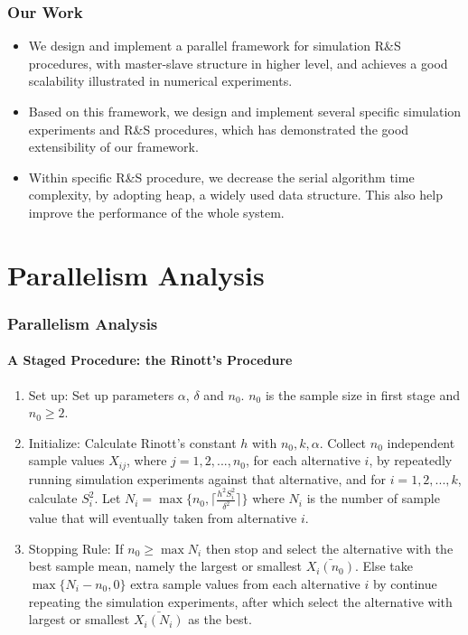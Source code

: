 \documentclass{beamer}
\begin{document}
\begin{frame}
\frametitle{Our Work}
\begin{itemize}
\item We design and implement a parallel framework for simulation R\&S procedures, with master-slave structure in higher level, and achieves a good scalability illustrated in numerical experiments.
\vspace{\baselineskip}
\item Based on this framework, we design and implement several specific simulation experiments and R\&S procedures, which has demonstrated the good extensibility of our framework.
\vspace{\baselineskip}
\item Within specific R\&S procedure, we decrease the serial algorithm time complexity, by adopting heap, a widely used data structure. This also help improve the performance of the whole system.
\end{itemize}
\end{frame}

\section{Parallelism Analysis}

\begin{frame}
\frametitle{Parallelism Analysis}
\framesubtitle{A Staged Procedure: the Rinott's Procedure}
\begin{enumerate}
\item{Set up: } Set up parameters $\alpha$, $\delta$ and $n_0$. $n_0$ is the sample size in first stage and $n_0 \geqslant 2$.
\item{Initialize: } Calculate Rinott's constant $h$ with $n_0, k, \alpha$. Collect $n_0$ independent sample values $X_{ij}$, where $j = 1, 2,...,n_0$, for each alternative $i$, by repeatedly running simulation experiments against that alternative, and for $i = 1, 2,...,k$, calculate $S_i^2$. Let 
$ N_i = \max\{n_0, \lceil \frac{h^2S_i^2}{\delta^2} \rceil\} $ where $N_i$ is the number of sample value that will eventually taken from alternative $i$.
\item{Stopping Rule: } If $n_0 \geqslant \max N_i$ then stop and select the alternative with the best sample mean, namely the largest or smallest $\bar{X_i(n_0)}$. Else take $\max\{N_i - n_0, 0\}$ extra sample values from each alternative $i$ by continue repeating the simulation experiments, after which select the alternative with largest or smallest $\bar{X_i(N_i)}$ as the best.
\end{enumerate}
\end{frame}
\end{document}
